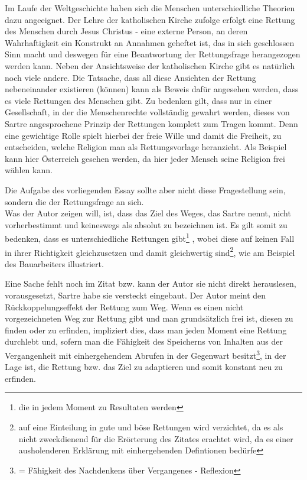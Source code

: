 \documentclass[12pt,a4paper,oneside]{article}
\begin{document}
  Im Laufe der Weltgeschichte haben sich die Menschen unterschiedliche Theorien dazu angeeignet. Der Lehre der katholischen Kirche zufolge erfolgt eine Rettung des Menschen durch Jesus Christus - eine externe Person, an deren Wahrhaftigkeit ein Konstrukt an Annahmen geheftet ist, das in sich geschlossen Sinn macht und deswegen für eine Beantwortung der Rettungsfrage herangezogen werden kann. Neben der Ansichtsweise der katholischen Kirche gibt es natürlich noch viele andere. Die Tatsache, dass all diese Ansichten der Rettung nebeneinander existieren (können) kann als Beweis dafür angesehen werden, dass es viele Rettungen des Menschen gibt. Zu bedenken gilt, dass nur in einer Gesellschaft, in der die Menschenrechte vollständig gewahrt werden, dieses von Sartre angesprochene Prinzip der Rettungen komplett zum Tragen kommt. Denn eine gewichtige Rolle spielt hierbei der freie Wille und damit die Freiheit, zu entscheiden, welche Religion man als Rettungsvorlage heranzieht. Als Beispiel kann hier Österreich gesehen werden, da hier jeder Mensch seine Religion frei wählen kann. 
  
  Die Aufgabe des vorliegenden Essay sollte aber nicht diese Fragestellung sein, sondern die der Rettungsfrage an sich.\\
  
  Was der Autor zeigen will, ist, dass das Ziel des Weges, das Sartre nennt, nicht vorherbestimmt und keineswegs als absolut zu bezeichnen ist. Es gilt somit zu bedenken, dass es unterschiedliche Rettungen gibt\footnote{die in jedem Moment zu Resultaten werden} , wobei diese auf keinen Fall in ihrer Richtigkeit gleichzusetzen und damit gleichwertig sind\footnote{auf eine Einteilung in gute und böse Rettungen wird verzichtet, da es als nicht zweckdienend für die Erörterung des Zitates erachtet wird, da es einer ausholenderen Erklärung mit einhergehenden Defintionen bedürfe}, wie am Beispiel des Bauarbeiters illustriert. 
  
  Eine Sache fehlt noch im Zitat bzw. kann der Autor sie nicht direkt herauslesen, vorausgesetzt, Sartre habe sie versteckt eingebaut. Der Autor meint den Rückkoppelungseffekt der Rettung zum Weg. Wenn es einen nicht vorgezeichneten Weg zur Rettung gibt und man grundsätzlich frei ist, diesen zu finden oder zu erfinden, impliziert dies, dass man jeden Moment eine Rettung durchlebt und, sofern man die Fähigkeit des Speicherns von Inhalten aus der Vergangenheit mit einhergehendem Abrufen in der Gegenwart besitzt\footnote{= Fähigkeit des Nachdenkens über Vergangenes - Reflexion}, in der Lage ist, die Rettung bzw. das Ziel zu adaptieren und somit konstant neu zu erfinden. \\
  
\end{document}
